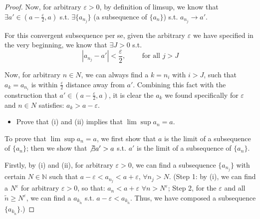 \documentclass[12pt]{article}
\newcommand{\N}{{\mathbb N}}
\theoremstyle{definition}
\theoremstyle{plain}
\begin{document}
\begin{proof}
    Now, for arbitrary $\varepsilon > 0$, by definition of limsup, we know that 
    $\exists 
    a' \in (a - \frac{\varepsilon}{2}, a)$ s.t. $\exists \{a_{n_j}\}$ (a 
    subsequence of $\{a_n\}$) s.t. $a_{n_j} \to a'$.

    For this convergent subsequence per se, given the arbitrary $\varepsilon$ we 
    have specified in the very beginning, we know that $\exists J > 0$ s.t. 
    \[
        |a_{n_j} - a'| < \frac{\varepsilon}{2}, \qquad 
        \text{ for all } j > J
    \]

    Now, for arbitrary $n \in N$, we can always find a $k = n_i$ with $i> J$, 
    such that $a_k = a_{n_i}$ is within $\frac{\varepsilon}{2}$ distance away 
    from $a'$. Combining this fact with the construction that $a' \in (a - 
    \frac{\varepsilon}{2}, a)$, it is clear the $a_k$ we found specifically for 
    $\varepsilon$ and $n\in N$ satisfies: $a_k > a - \varepsilon$.
    


%
%

    \begin{itemize}
        \item Prove that (i) and (ii) implies that $\lim\sup a_n = a$.
    \end{itemize}
    To prove that $\lim\sup a_n = a$, we first show that $a$ is the limit of a 
    subsequence of $\{a_n\}$; then we show that $\not\exists a' > a$ s.t. $a'$ 
    is the limit of a subsequence of $\{a_n\}$.

    Firstly, by (i) and (ii), for arbitrary $\varepsilon>  0$, we can find a 
    subsequence $\{a_{n_j}\}$ with certain $N\in \N$ 
    such that $a - \varepsilon < a_{n_j} < a + \varepsilon$, $\forall n_j > N$. 
    (Step 1: by (i), we can find a $N^\varepsilon$ for arbitrary $\varepsilon > 
           0$, so that: $a_n < a + \varepsilon$ $\forall n > N^\varepsilon$; Step 2, for the $\varepsilon$ 
           and all $\tilde n \ge N^\varepsilon$, we can find a $a_{k_{\tilde n}}$ 
           s.t.  $a - \varepsilon < a_{k_{\tilde n}}$. Thus, we have composed a 
       subsequence $\{a_{k_{\tilde n}}\}$.)


\end{proof}
\end{document}
